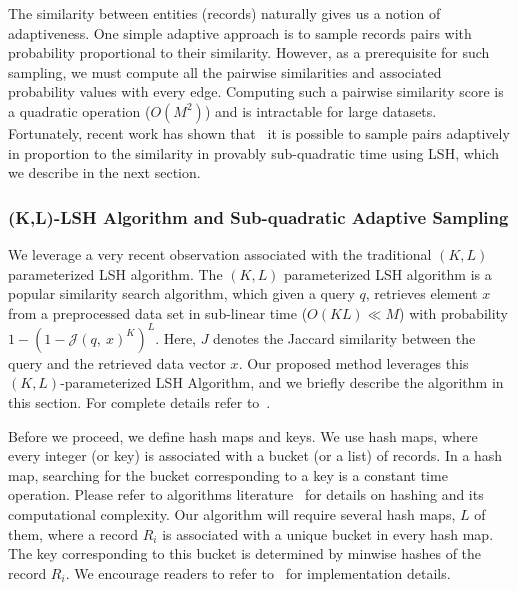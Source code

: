 \documentclass{imsart}
\begin{document}
The similarity between entities (records) naturally gives us a notion of adaptiveness. One simple adaptive approach is to sample records pairs with probability proportional to their similarity. However, as a prerequisite for such sampling, we must compute all the pairwise similarities and associated probability values with every edge. Computing such a pairwise similarity score is a quadratic operation ($O(M^2)$) and is intractable for large datasets. Fortunately, recent work has shown that~\citep{spring2017scalable,spring2017new,luo2017Arrays} it is possible to sample pairs adaptively in proportion to the similarity in provably sub-quadratic time using LSH, which we describe in the next section.

\subsubsection{(K,L)-LSH Algorithm and Sub-quadratic Adaptive Sampling}
\label{sec:KLParametrizedLSH}

We leverage a very recent observation associated with the traditional $(K, L)$ parameterized LSH algorithm. The $(K, L)$ parameterized LSH algorithm is a popular similarity search algorithm, which given a query $q$, retrieves element $x$ from a preprocessed data set in sub-linear time ($O(KL) \ll M$) with probability $1-(1-\mathcal{J}(q,\ x)^K)^L$.  Here, $J$ denotes the Jaccard similarity between the query and the retrieved data vector $x$. Our proposed method leverages this $(K, L)$-parameterized LSH Algorithm, and we briefly describe the algorithm in this section. For complete details refer to~\cite{Report:E2LSH}.

Before we proceed, we define hash maps and keys. We use hash maps, where every integer (or key) is associated with a bucket (or a list) of records. In a hash map, searching for the bucket corresponding to a key is a constant time operation. Please refer to algorithms literature~\citep{rajaraman_2012} for details on hashing and its computational complexity. Our algorithm will require several hash maps, $L$ of them, where a record $R_i$ is associated with a unique bucket in every hash map. The key corresponding to this bucket is determined by minwise hashes of the record $R_i$. We encourage readers to refer to~\cite{Report:E2LSH} for implementation details.
\end{document}
